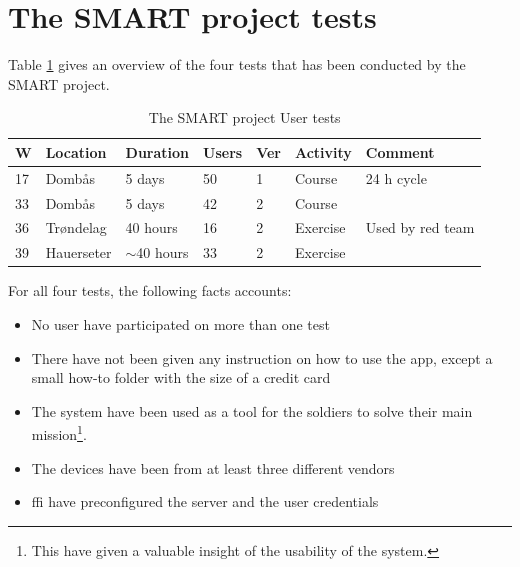 \section{The SMART project tests}
Table \ref{tab:smart_tests} gives an overview of the four tests that has been conducted by the SMART project. 
\begin{table}[]
\centering
\caption{The SMART project User tests}
\label{tab:smart_tests}
\begin{tabular}{|l|l|l|l|l|l|l|}
\hline
W & Location   & Duration      & Users & Ver & Activity & Comment       \\ \hline
17        & Domb{\aa}s     &  5 days              & 50  & 1  & Course & 24 h cycle \\ \hline
33        & Domb{\aa}s     &   5 days            & 42   & 2 & Course &               \\ \hline
36        & Tr{\o}ndelag  &  40 hours              & 16  & 2 & Exercise &    Used by red team\footnotemark           \\ \hline
39        & Hauerseter  & $\sim$40 hours & 33   & 2  & Exercise         &               \\ \hline
\end{tabular}
\end{table}

For all four tests, the following facts accounts:
\begin{itemize}
	\item{No user have participated on more than one test}
	\item{There have not been given any instruction on how to use the app, except a small how-to folder with the size of a credit card}
	\item{The system have been used as a tool for the soldiers to solve their main mission\footnote{This have given a valuable insight of the usability of the system.}. }
	\item{The devices have been from at least three different vendors}
	\item{\gls{ffi} have preconfigured the server and the user credentials}
\end{itemize}

